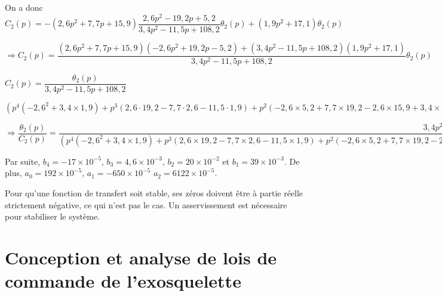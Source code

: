 \begin{corrige}
On a donc 
$C_2(p) = - \left( 2,6 p^2 + 7,7 p + 15,9\right)\dfrac{2,6p^2 - 19,2p + 5,2}{3,4 p^2 - 11,5 p + 108,2}\theta_2(p) + \left( 1,9 p^2+ 17,1\right)\theta_2(p) $


$\Rightarrow C_2(p) = 
\dfrac{\left( 2,6 p^2 + 7,7 p + 15,9\right)\left(-2,6p^2 + 19,2p - 5,2\right) + \left(3,4 p^2 - 11,5 p + 108,2\right) \left( 1,9 p^2+ 17,1\right)}{3,4 p^2 - 11,5 p + 108,2} \theta_2(p)$

\begin{tiny}
$C_2(p) =  \dfrac{\theta_2(p)}{3,4 p^2 - 11,5 p + 108,2} $

$\left(p^4 \left( - 2,6 ^2 +3,4 \times 1,9 \right)
+p^3 \left( 2,6 \cdot 19,2 - 7,7\cdot 2,6  -11,5 \cdot 1,9\right)
+p^2 \left( -2,6 \times 5,2 +7,7 \times 19,2 - 2,6 \times 15,9 +3,4 \times 17,1 +108,2 \times 1,9 \right) 
+p \left( -7,7 \times 5,2 + 15,9 \times 19,2 -11,5 \times 17,1\right)
- 15,9 \times 5,2 +108,2 \times 17,1\right)$


$\Rightarrow \dfrac{\theta_2(p)}{C_2(p)} =\dfrac{3,4 p^2 - 11,5 p + 108,2} {\left(p^4 \left( - 2,6 ^2 +3,4 \times 1,9 \right)
+p^3 \left( 2,6 \times 19,2 - 7,7 \times 2,6  -11,5 \times 1,9\right) 
+p^2 \left( -2,6 \times 5,2 +7,7 \times 19,2 - 2,6 \times 15,9 +3,4 \times 17,1 +108,2 \times 1,9 \right) 
+p \left( -7,7 \times 5,2 + 15,9 \times 19,2 -11,5 \times 17,1\right)
- 15,9 \times 5,2 +108,2 \times 17,1\right)}$
\end{tiny}

Par suite, $b_4 = -17 \times 10^{-5}$, $b_3 = 4,6 \times 10^{-3}$, $b_2=20 \times 10^{-2} $ et $b_1 = 39 \times 10^{-3}$.
De plus, $a_0 = 192\times 10^{-5}$, $a_1=-650\times 10^{-5}$ $a_2 =  6122\times 10^{-5}$.


\end{corrige}\else\fi



\ifprof\begin{corrige}
Pour qu'une fonction de transfert soit stable, ses zéros doivent être à partie réelle strictement négative, ce qui n'est pas le cas. Un asservissement est nécessaire pour stabiliser le système.
\end{corrige}\else\fi

\section{Conception et analyse de lois de commande de l’exosquelette}

